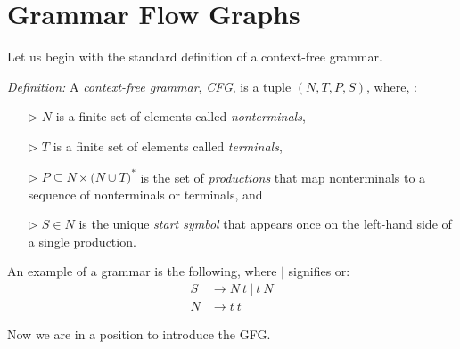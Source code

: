 \documentclass{sigplanconf}
\begin{document}
\section{Grammar Flow Graphs}
Let us begin with the standard definition of a context-free grammar.

\textit{Definition:} A \textit{context-free grammar}, \textit{CFG}, is a tuple $(N, T, P, S)$, where, \cite{bilardi-pingali}:
\begin{itemize}
\item[$\triangleright$] $N$ is a finite set of elements called \textit{nonterminals}, 
\item[$\triangleright$] $T$ is a finite set of elements called \textit{terminals}, 
\item[$\triangleright$] $P\subseteq{N\times{(N\cup{T}}})^*$ is the set of \textit{productions} that map nonterminals to a sequence of nonterminals or terminals, and 
\item[$\triangleright$] $S\in{N}$ is the unique \textit{start symbol} that appears once on the left-hand side of a single production.
\end{itemize}

An example of a grammar is the following, where $|$ signifies or:
\begin{align*}
S&\longrightarrow{N \: t \: | \: t \: N} \\
N&\longrightarrow{t \: t}
\end{align*}

Now we are in a position to introduce the GFG.
\end{document}

